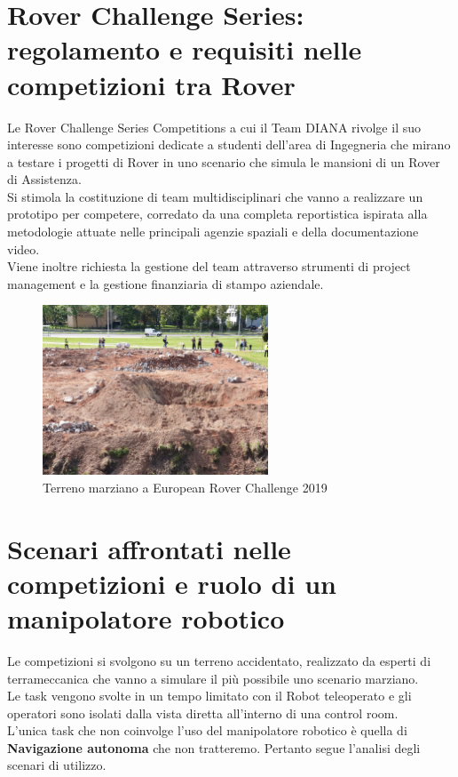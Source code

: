\documentclass[%
corpo=11pt,
twoside,
 stile=classica,
oldstyle,
greek,%
]{toptesi}
\begin{document}
	\section{Rover Challenge Series: regolamento e requisiti nelle competizioni tra Rover}
	Le Rover Challenge Series Competitions a cui il Team DIANA rivolge il suo interesse sono competizioni dedicate a studenti dell'area di Ingegneria che mirano a testare i progetti di Rover in uno scenario che simula le mansioni di un Rover di Assistenza.\\
	Si stimola la costituzione di team multidisciplinari che vanno a realizzare un prototipo per competere, corredato da una completa reportistica ispirata alla metodologie attuate nelle principali agenzie spaziali e della documentazione video.\\
	 Viene inoltre richiesta la gestione del team attraverso strumenti di project management e la gestione finanziaria di stampo aziendale.
 
	\begin{figure}
		\centering
		\includegraphics[width=0.6\textwidth]{image/terrain.jpeg}
		\caption{Terreno marziano a European Rover Challenge 2019}
		\label{fig:ercterrain}
	\end{figure}

	\section{Scenari affrontati nelle competizioni e ruolo di un manipolatore robotico}
		Le competizioni si svolgono su un terreno accidentato, realizzato da esperti di terrameccanica che vanno a simulare il più possibile uno scenario marziano. \\
		Le task vengono svolte in un tempo limitato con il Robot teleoperato e gli operatori sono isolati dalla vista diretta all'interno di una control room. \\
		
		L'unica task che non coinvolge l'uso del manipolatore robotico è quella di \textbf{Navigazione autonoma} che non tratteremo. 
		Pertanto segue l'analisi degli scenari di utilizzo. 
\end{document}
